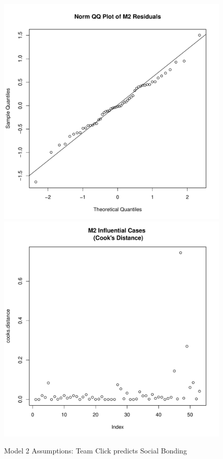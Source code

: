 \begin{figure}[htbp]
    \includegraphics[scale =.4]{images/TEM2QQNorm.pdf}
    \includegraphics[scale =.4]{images/TEM2CooksD.pdf}
    \caption{Model 2 Assumptions: Team Click predicts Social Bonding}
    \label{fig:M2Assumptions}
\end{figure}


